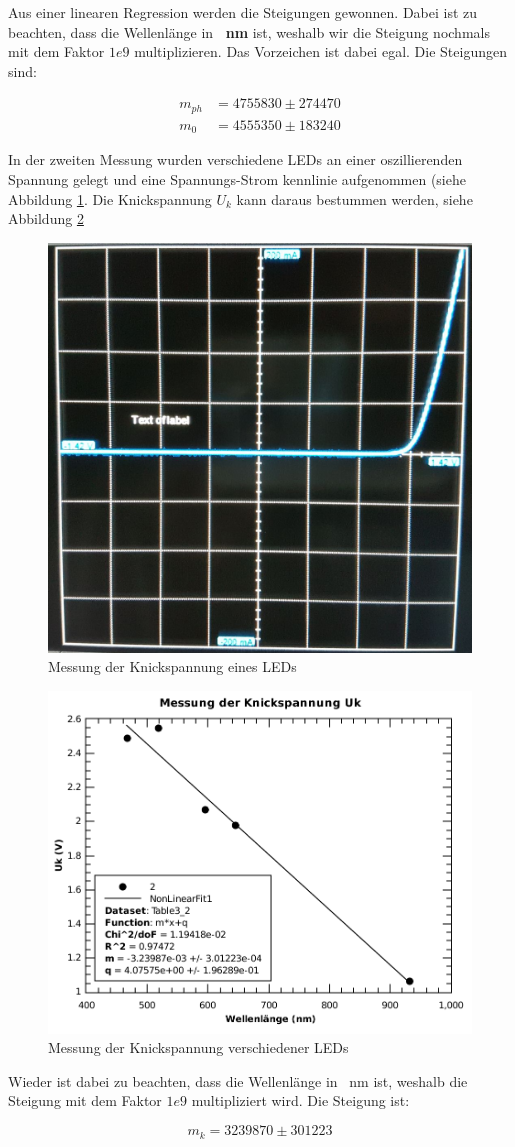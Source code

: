 Aus  einer  linearen  Regression werden die Steigungen gewonnen. Dabei ist  zu
beachten,  dass die Wellenl\"ange in \textbf{\SI{}{\nano\meter}} ist,  weshalb
wir die Steigung  nochmals mit dem Faktor $1e9$ multiplizieren. Das Vorzeichen
ist dabei egal. Die Steigungen sind:

\begin{align*}
    m_{ph} &= 4755830 \pm 274470 \\
    m_0    &= 4555350 \pm 183240
\end{align*}

\clearpage

In der zweiten  Messung  wurden  verschiedene  LEDs  an  einer  oszillierenden
Spannung   gelegt  und  eine  Spannungs-Strom  kennlinie  aufgenommen   (siehe
Abbildung \ref{fig:knickspannung-plot}. Die  Knickspannung  $U_k$  kann daraus
bestummen werden, siehe Abbildung \ref{fig:knickspannung}

\begin{figure}[H]
    \centering
    \includegraphics[width=.5\linewidth]{images/knickspannung.png}
    \caption{Messung der Knickspannung eines LEDs}
    \label{fig:knickspannung-plot}
\end{figure}

\begin{figure}[H]
    \centering
    \includegraphics[width=.5\linewidth]{images/knickspannung.pdf}
    \caption{Messung der Knickspannung verschiedener LEDs}
    \label{fig:knickspannung}
\end{figure}

Wieder ist dabei zu beachten,  dass  die  Wellenl\"ange  in \SI{}{\nano\meter}
ist,  weshalb  die  Steigung  mit  dem  Faktor  $1e9$  multipliziert wird. Die
Steigung ist:

\begin{equation}
    m_{k} = 3239870 \pm 301223
\end{equation}

